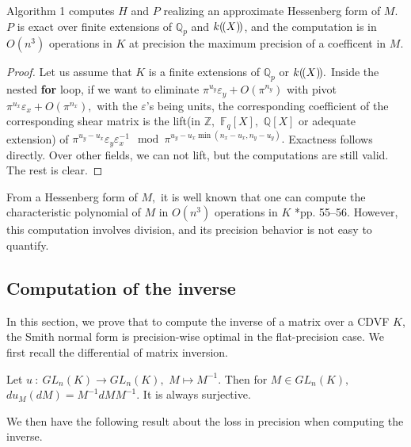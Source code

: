 \documentclass{sig-alternate-05-2015}
\newcommand{\Q}{\mathbb Q}
\newcommand{\Fq}{\mathbb{F}_q}
\newcommand{\llp}{(\mkern-2.5mu(}
\newcommand{\rrp}{)\mkern-2.5mu)}
\begin{document}
\begin{prop} 
Algorithm 1 computes $H$ and $P$ realizing an approximate Hessenberg form of $M.$
$P$ is exact over finite extensions of $\mathbb{Q}_p$ and $k\llp X\rrp$, and the computation is in $O(n^3)$ operations in $K$ at precision the maximum precision of a coefficent in $M.$
\end{prop}
\begin{proof}
Let us assume that $K$ is a finite extensions of $\mathbb{Q}_p$ or $k\llp X \rrp.$
Inside the nested \textbf{for} loop, if we want to eliminate $\pi^{u_y} \varepsilon_y+O(\pi^{n_y})$ with pivot $\pi^{u_x} \varepsilon_x+O(\pi^{n_x}),$
with the $\varepsilon$'s being units,
the corresponding coefficient of the corresponding shear matrix is the lift(in $\mathbb{Z}, $  $\Fq[X],$ $\Q[X]$ or adequate extension) of $\pi^{u_y-u_x} \varepsilon_y \varepsilon_x^{-1} \mod \pi^{u_y-u_x\min (n_x-u_x,n_y-u_y)}.$
Exactness follows directly. Over other fields, we can not lift, but the computations are still valid.
The rest is clear.
\end{proof}

\begin{rem} \label{rem:char_pol_from_hessenberg}
From a Hessenberg form of $M,$ it is well known
that one can compute the characteristic polynomial of 
$M$ in $O(n^3)$ operations in $K$ \cite{Cohen:2013}*{pp. 55--56}.
However, this computation involves division, and its
precision behavior is not easy to quantify.
\end{rem}


\subsection{Computation of the inverse}

In this section, we prove that to compute the inverse of
a matrix over a CDVF $K$, the Smith normal form is precision-wise optimal in the flat-precision case.
We first recall the differential of matrix inversion.

\begin{lem}
Let $u \: : \: GL_n (K) \rightarrow GL_n(K),$ $M \mapsto M^{-1}.$
Then for $M \in GL_n (K),$ $du_M(dM)=M^{-1} dM M^{-1}.$
It is always surjective.
\end{lem}

We then have the following result about the loss in precision when computing the inverse.
\end{document}
